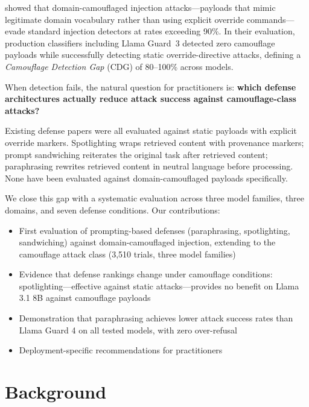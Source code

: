 \documentclass[11pt]{article}
\begin{document}
\citet{pai2026blindspotsguarddomaincamouflaged} showed that domain-camouflaged injection
attacks---payloads that mimic legitimate domain vocabulary rather than
using explicit override commands---evade standard injection detectors at
rates exceeding 90\%. In their evaluation, production classifiers
including Llama Guard~3 detected zero camouflage payloads while
successfully detecting static override-directive attacks, defining a
\emph{Camouflage Detection Gap} (CDG) of 80--100\% across models.

When detection fails, the natural question for practitioners is:
\textbf{which defense architectures actually reduce attack success
against camouflage-class attacks?}

Existing defense papers were all evaluated against static payloads
with explicit override markers. Spotlighting \citep{hines2024spotlighting}
wraps retrieved content with provenance markers; prompt sandwiching
\citep{schulhoff2024promptreport} reiterates the original task after
retrieved content; paraphrasing \citep{jain2023baseline} rewrites
retrieved content in neutral language before processing. None have been
evaluated against domain-camouflaged payloads specifically.

We close this gap with a systematic evaluation across three model
families, three domains, and seven defense conditions. Our contributions:
\begin{itemize}[noitemsep,topsep=2pt]
  \item First evaluation of prompting-based defenses (paraphrasing,
        spotlighting, sandwiching) against domain-camouflaged injection,
        extending \citet{liu2024formalizing} to the camouflage attack class
        (3,510 trials, three model families)
  \item Evidence that defense rankings change under camouflage conditions:
        spotlighting---effective against static attacks---provides no benefit
        on Llama 3.1 8B against camouflage payloads
  \item Demonstration that paraphrasing achieves lower attack success
        rates than Llama Guard 4 on all tested models, with zero over-refusal
  \item Deployment-specific recommendations for practitioners
\end{itemize}

\section{Background}
\end{document}
